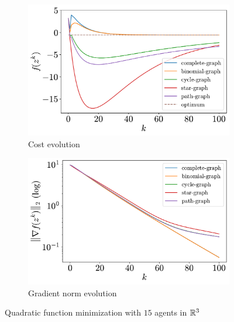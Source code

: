\documentclass[a4paper,11pt,oneside]{book}
\begin{document}
\begin{figure}[htb!]
      \centering
      \begin{subfigure}[t]{0.46\linewidth}
            \centering
            \includegraphics[width=\linewidth]{./figs/quadratic/15_3_100/cost.pdf} 
            \caption{Cost evolution}
      \end{subfigure}
      \hfill
      \begin{subfigure}[t]{0.46\linewidth}
            \centering
            \includegraphics[width=\linewidth]{./figs/quadratic/15_3_100/gradient.pdf} 
            \caption{Gradient norm evolution}
      \end{subfigure}
      \caption{Quadratic function minimization with $15$ agents in ${\mathbb{R}}^{3}$}
      \label{fig:quadratic_15_3}
\end{figure}
\end{document}
